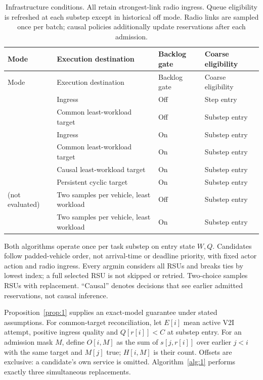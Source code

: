 \documentclass[12pt,a4paper]{article}
\begin{document}
\begingroup
\singlespacing\footnotesize\setlength{\tabcolsep}{3pt}
\begin{xltabular}{\textwidth}{@{}YYYY@{}}
\caption[Infrastructure conditions]{Infrastructure conditions. All retain strongest-link radio ingress. Queue eligibility is refreshed at each substep except in historical off mode. Radio links are sampled once per batch; causal policies additionally update reservations after each admission.}\label{tab:3} \\
\toprule
Mode & Execution destination & Backlog gate & Coarse eligibility \\
\midrule\endfirsthead
\toprule
Mode & Execution destination & Backlog gate & Coarse eligibility \\
\midrule\endhead
\bottomrule\endfoot
{} & Ingress & Off & Step entry \\
 & Common least-workload target & Off & Substep entry \\
 & Ingress & On & Substep entry \\
 & Common least-workload target & On & Substep entry \\
 & Causal least-workload target & On & Substep entry \\
 & Persistent cyclic target & On & Substep entry \\
 (not evaluated) & Two samples per vehicle, least workload & Off & Substep entry \\
 & Two samples per vehicle, least workload & On & Substep entry \\
\end{xltabular}
\endgroup

Both algorithms operate once per task substep on entry state $W,Q$. Candidates follow padded-vehicle order, not arrival-time or deadline priority, with fixed actor action and radio ingress. Every argmin considers all RSUs and breaks ties by lowest index; a full selected RSU is not skipped or retried. Two-choice samples RSUs with replacement. ``Causal'' denotes decisions that see earlier admitted reservations, not causal inference.

Proposition~\ref{prop:1} supplies an exact-model guarantee under stated assumptions. For common-target reconciliation, let $E[i]$ mean active V2I attempt, positive ingress quality and $Q[r[i]]<C$ at substep entry. For an admission mask $M$, define $O[i,M]$ as the sum of $s[j,r[i]]$ over earlier $j<i$ with the same target and $M[j]$ true; $H[i,M]$ is their count. Offsets are exclusive: a candidate's own service is omitted. Algorithm~\ref{alg:1} performs exactly three simultaneous replacements.
\end{document}
